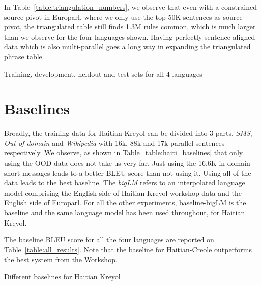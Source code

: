 	In Table~\ref{table:triangulation_numbers}, we observe that even with a constrained source pivot in Europarl, where we only use the top 50K sentences as source pivot, the triangulated table still finds 1.3M rules common, which is much larger than we observe for the four languages shown. Having perfectly sentence aligned data which is also multi-parallel goes a long way in expanding the triangulated phrase table. 

\begin{table}
         \small
         \centering
         
         \caption{Training, development, heldout and test sets for all 4 languages}
         \label{table:ddtt}
\end{table}



\section{Baselines}
\label{sec:baselines}
Broadly, the training data for Haitian Kreyol can be divided into 3 parts, \emph{SMS}, \emph{Out-of-domain} and \emph{Wikipedia} with 16k, 88k and 17k parallel sentences respectively. We observe, as shown in Table~\ref{table:haiti_baselines} that only using the OOD data does not take us very far. Just using the 16.6K in-domain short messages leads to a better BLEU score than not using it. Using all of the data leads to the best baseline. The \emph{bigLM} refers to an interpolated language model comprising the English side of Haitian Kreyol workshop data and the English side of Europarl. For all the other experiments, baseline-bigLM is the baseline and the same language model has been used throughout, for Haitian Kreyol. 

The baseline BLEU score for all the four languages are reported on Table~\ref{table:all_results}. Note that the baseline for Haitian-Creole outperforms the best system from the Workshop. 

\begin{table}
	\small
	\centering
	
	\caption{Different baselines for Haitian Kreyol}
	\label{table:haiti_baselines}
\end{table}




